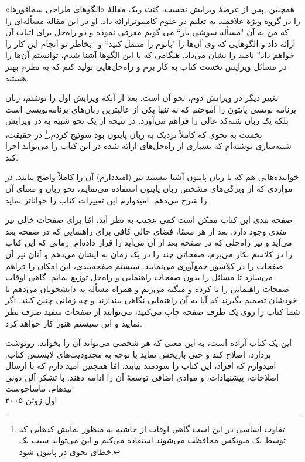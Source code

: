 \documentclass{book}
\begin{document}
همچنین، پس از عرضهٔ ویرایش نخست، کنث ریک  مقالهٔ «الگوهای طراحی سمافورها»%
را در گروه ویژهٔ   علاقمند به تعلیم در علوم کامپیوترارائه داد.
او در این مقاله مسأله‌ای را که من به آن "مسأله سوشی بار`` می گویم معرفی نموده و 
دو راه‌حل برای اثبات آن  ارائه داد و الگوهایی که وی آن‌ها را "باتوم را منتقل کنید`` 
و ``بخاطر تو انجام این کار را خواهم داد'' نامید را نشان می‌داد.
هنگامی که با این الگوها آشنا شدم، توانستم آن‌ها را در مسائل ویرایش نخست کتاب به کار برم و راه‌حل‌هایی تولید کنم که به نظرم بهتر هستند.

تغییر دیگر در ویرایش دوم، نحو آن است. 
بعد از آنکه ویرایش اول را نوشتم، زبان برنامه نویسی پایتون را آموختم 
که نه تنها یکی از عالیترین زبان‌های برنامه‌نویسی است بلکه یک زبان شبه‌کد عالی را فراهم می‌آورد. 
در نتیجه از یک نحو شبیه به  در ویرایش نخست به نحوی که کاملاً نزدیک به زبان پایتون بود سوئیچ کردم.\footnote{تفاوت اساسی در این است 
گاهی اوقات از حاشیه به منظور نمایش کدهایی که توسط یک میوتکس محافظت می‌شوند استفاده می‌کنم و این می‌تواند سبب یک خطای نحوی در پایتون شود.}
در حقیقت، شبیه‌سازی نوشته‌ام که بسیاری از راه‌حل‌های ارائه شده در این کتاب را می‌تواند اجرا کند. 

خواننده‌هایی هم که با زبان پایتون آشنا نیستند نیز (امیددارم) آن را کاملاً واضح بیابند.
در مواردی که از ویژگی‌های مشخص زبان پایتون استفاده می‌نمایم، نحو زبان  و معنای آن را شرح می‌دهم. امیدوارم این تغییرات کتاب را خواناتر نماید.

صفحه بندی این کتاب ممکن است کمی عجیب به نظر آید،  امّا برای صفحات خالی نیز متدی وجود دارد. 
بعد از هر معمّا، فضای خالی کافی برای راهنمایی که در صفحه بعد می‌آید و نیز راه‌حلی که در صفحه بعد از آن می‌آید را قرار داده‌ام. 
زمانی که این کتاب را در کلاسم بکار می‌برم، صفحاتی چند را در یک زمان به ایشان می‌دهم و آنان نیز آن صفحات را در کلاسور جمع‌آوری می‌نمایند. 
سیستم صفحه‌بندی، این امکان را فراهم می‌سازد تا مسائل را بدون صفحات  راهنمایی و راه‌حل توزیع نمایم. 
گاهی اوقات صفحات راهنمایی را تا کرده و منگنه می‌زنم و همراه مسأله به دانشجویان می‌دهم تا خودشان تصمیم بگیرند که آیا به آن راهنمایی 
نگاهی بیندازند و چه زمانی چنین کنند. 
اگر شما کتاب را روی یک طرف صفحه چاپ می‌کنید، می‌توانید از صفحات سفید صرف نظر نمایید و این سیستم هنوز کار خواهد کرد. 

این یک کتاب آزاده است، به این معنی که هر شخصی می‌تواند آن را بخواند، رونوشت بردارد، اصلاح کند و حتی بازپخش نماید  با توجه به 
محدودیت‌های لایسنس کتاب. 
امیدوارم که افراد، این کتاب را سودمند بیابند، امّا همچنین امید دارم که با ارسال اصلاحات، پیشنهادات، و موادی اضافی توسعهٔ‌ آن را ادامه دهند. 
با تشکر
\vspace{0.3in}
\noindent آلن دونی \\
\noindent نیدهام، ماساچوست \\
\noindent اول ژوئن ۲۰۰۵
\end{document}
